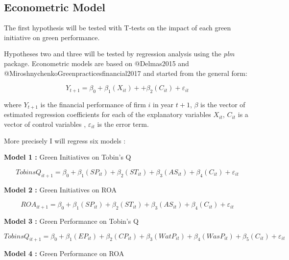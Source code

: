 \documentclass[]{article}
\begin{document}
\newpage

\subsection{Econometric Model}\label{econometric-model}

The first hypothesis will be tested with T-tests on the impact of each
green initiative on green performance.

Hypotheses two and three will be tested by regression analysis using the
\emph{plm} package. Econometric models are based on @Delmas2015 and
@MiroshnychenkoGreenpracticesfinancial2017 and started from the general
form:

\begin{equation}
Y_{t+1}=\beta_{0} + \beta_{1} (X_{it}) + + \beta_{2} (C_{it}) + \varepsilon_{it}
\label{GeneralForm}
\end{equation}

where \(Y_{t+1}\) is the financial performance of firm \(i\) in year
\(t+1\), \(\beta\) is the vector of estimated regression coefficients
for each of the explanatory variables \(X_{it}\), \(C_{it}\) is a vector
of control variables , \(\varepsilon_{it}\) is the error term.

More precisely I will regress six models :

\textbf{Model 1 :} Green Initiatives on Tobin's Q

\begin{equation}
TobinsQ_{it+1} = \beta_{0} + \beta_{1} (SP_{it}) + \beta_{2} (ST_{it}) + \beta_{3} (AS_{it}) + \beta_{4} (C_{it}) + \varepsilon_{it}
\label{M1}
\end{equation}

\textbf{Model 2 :} Green Initiatives on ROA

\begin{equation}
ROA_{it+1} = \beta_{0} + \beta_{1} (SP_{it}) + \beta_{2} (ST_{it}) + \beta_{3} (AS_{it}) + \beta_{4} (C_{it}) + \varepsilon_{it}
\label{M2}
\end{equation}

\textbf{Model 3 :} Green Performance on Tobin's Q

\begin{equation}
TobinsQ_{it+1} = \beta_{0} + \beta_{1} (EP_{it}) + \beta_{2} (CP_{it}) + \beta_{3} (WatP_{it}) + \beta_{4} (WasP_{it}) + \beta_{5} (C_{it}) + \varepsilon_{it}
\label{M3}
\end{equation}

\textbf{Model 4 :} Green Performance on ROA
\end{document}
